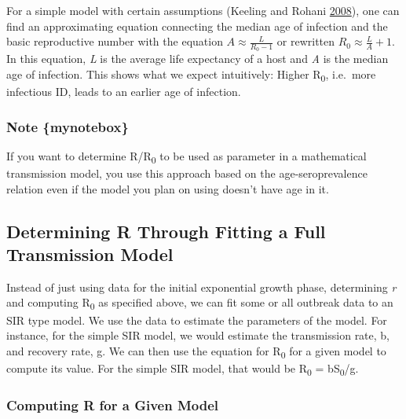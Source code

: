 \documentclass[]{book}
\theoremstyle{definition}
\theoremstyle{definition}
\theoremstyle{definition}
\theoremstyle{remark}
\begin{document}
For a simple model with certain assumptions (Keeling and Rohani
\protect\hyperlink{ref-keeling08}{2008}), one can find an approximating
equation connecting the median age of infection and the basic
reproductive number with the equation \(A \approx \frac {L}{R_0 - 1}\)
or rewritten \(R_0 \approx \frac{L}{A} + 1\). In this equation, \emph{L}
is the average life expectancy of a host and \emph{A} is the median age
of infection. This shows what we expect intuitively: Higher
R\textsubscript{0}, i.e.~more infectious ID, leads to an earlier age of
infection.

\hypertarget{note-mynotebox}{%
\subsubsection{Note \{mynotebox\}}\label{note-mynotebox}}

If you want to determine R/R\textsubscript{0} to be used as parameter in
a mathematical transmission model, you use this approach based on the
age-seroprevalence relation even if the model you plan on using doesn't
have age in it.

\hypertarget{determining-r-through-fitting-a-full-transmission-model}{%
\subsection{Determining R Through Fitting a Full Transmission
Model}\label{determining-r-through-fitting-a-full-transmission-model}}

Instead of just using data for the initial exponential growth phase,
determining \emph{r} and computing R\textsubscript{0} as specified
above, we can fit some or all outbreak data to an SIR type model. We use
the data to estimate the parameters of the model. For instance, for the
simple SIR model, we would estimate the transmission rate, b, and
recovery rate, g. We can then use the equation for R\textsubscript{0}
for a given model to compute its value. For the simple SIR model, that
would be R\textsubscript{0} = bS\textsubscript{0}/g.

\hypertarget{myadvancedbox}{%
\subsubsection{Computing R for a Given Model}\label{myadvancedbox}}
\end{document}
